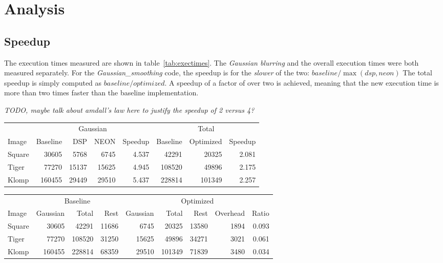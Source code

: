 \section{Analysis}
\label{sec:analysis}
\subsection{Speedup}
The execution times measured are shown in table~\ref{tab:exectimes}. The \emph{Gaussian blurring} and the overall execution times were both measured separately. For the \emph{Gaussian\_smoothing} code, the speedup is for the \emph{slower} of the two:
${baseline}/{\max(dsp,neon)}$ 
The total speedup is simply computed as 
${baseline}/{optimized}$.
A speedup of a factor of over two is achieved, meaning that the new execution time is more than two times faster than the baseline implementation.

\emph{TODO, maybe talk about amdall's law here to justify the speedup of 2 versus 4?}

\begin{table*}
\centering
\begin{tabular}{l | r r r r | r r r}
        & \multicolumn{4}{|c|}{Gaussian}                & \multicolumn{3}{|c}{Total}                \\
Image   & Baseline  & DSP   & NEON          & Speedup   & Baseline  & Optimized         & Speedup   \\
\hline
Square  & 30605     & 5768  & 6745          & 4.537     & 42291     & 20325             & 2.081     \\
Tiger   & 77270     & 15137 & 15625         & 4.945     & 108520    & 49896             & 2.175     \\
Klomp   & 160455    & 29449 & 29510         & 5.437     & 228814    & 101349            & 2.257     \\
\end{tabular}
\caption{The execution times measured in $\mu$s}
\label{tab:exectimes}
\end{table*}

\begin{table*}
\centering
\begin{tabular}{l | r r r | r r r r r}
        & \multicolumn{3}{|c|}{Baseline}    & \multicolumn{5}{|c}{Optimized}                        \\
Image   & Gaussian  & Total     & Rest      & Gaussian  & Total     & Rest  & Overhead  & Ratio     \\
\hline
Square  & 30605     & 42291     & 11686     & 6745      & 20325     & 13580 & 1894      & 0.093     \\
Tiger   & 77270     & 108520    & 31250     & 15625     & 49896     & 34271 & 3021      & 0.061     \\
Klomp   & 160455    & 228814    & 68359     & 29510     & 101349    & 71839 & 3480      & 0.034     \\
\end{tabular}
\caption{Calculating the overhead as a fraction, all times in $\mu$s}
\label{tab:overhead}
\end{table*}


